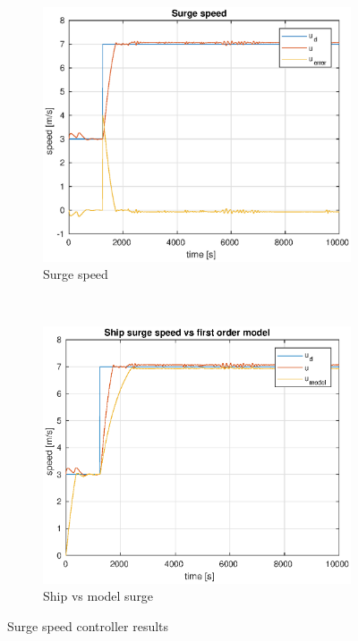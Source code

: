 \begin{figure}[ht]
	\begin{subfigure}[b]{0.45\textwidth}
		\includegraphics[width=\textwidth]{surge1_7}
		\caption{Surge speed}
		\label{fig:surge1_7}
	\end{subfigure}%
        ~
	\begin{subfigure}[b]{0.45\textwidth}
		\includegraphics[width=\textwidth]{surge_v_model1_7}
		\caption{Ship vs model surge}
		\label{fig:surge_v_model1_7}
	\end{subfigure}
	\caption{Surge speed controller results}\label{fig:1_7}
\end{figure}
